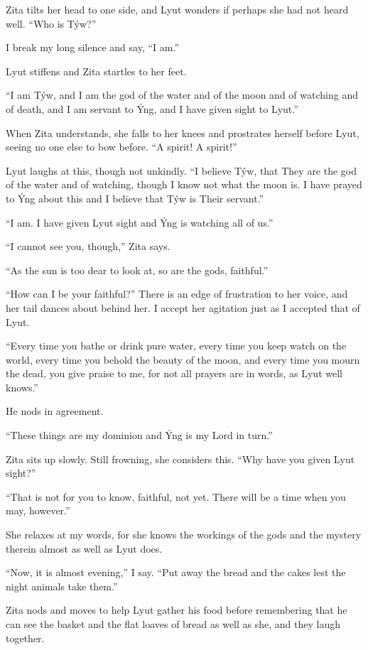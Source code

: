Zita tilts her head to one side, and Lyut wonders if perhaps she had not heard well. ``Who is Týw?''

I break my long silence and say, ``I am.''

Lyut stiffens and Zita startles to her feet.

``I am Týw, and I am the god of the water and of the moon and of watching and of death, and I am servant to Ýng, and I have given sight to Lyut.''

When Zita understands, she falls to her knees and prostrates herself before Lyut, seeing no one else to bow before. ``A spirit! A spirit!''

Lyut laughs at this, though not unkindly. ``I believe Týw, that They are the god of the water and of watching, though I know not what the moon is. I have prayed to Ýng about this and I believe that Týw is Their servant.''

``I am. I have given Lyut sight and Ýng is watching all of us.''

``I cannot see you, though,'' Zita says.

``As the sun is too dear to look at, so are the gods, faithful.''

``How can I be your faithful?'' There is an edge of frustration to her voice, and her tail dances about behind her. I accept her agitation just as I accepted that of Lyut.

``Every time you bathe or drink pure water, every time you keep watch on the world, every time you behold the beauty of the moon, and every time you mourn the dead, you give praise to me, for not all prayers are in words, as Lyut well knows.''

He nods in agreement.

``These things are my dominion and Ýng is my Lord in turn.''

Zita sits up slowly. Still frowning, she considers this. ``Why have you given Lyut sight?''

``That is not for you to know, faithful, not yet. There will be a time when you may, however.''

She relaxes at my words, for she knows the workings of the gods and the mystery therein almost as well as Lyut does.

``Now, it is almost evening,'' I say. ``Put away the bread and the cakes lest the night animals take them.''

Zita nods and moves to help Lyut gather his food before remembering that he can see the basket and the flat loaves of bread as well as she, and they laugh together.


